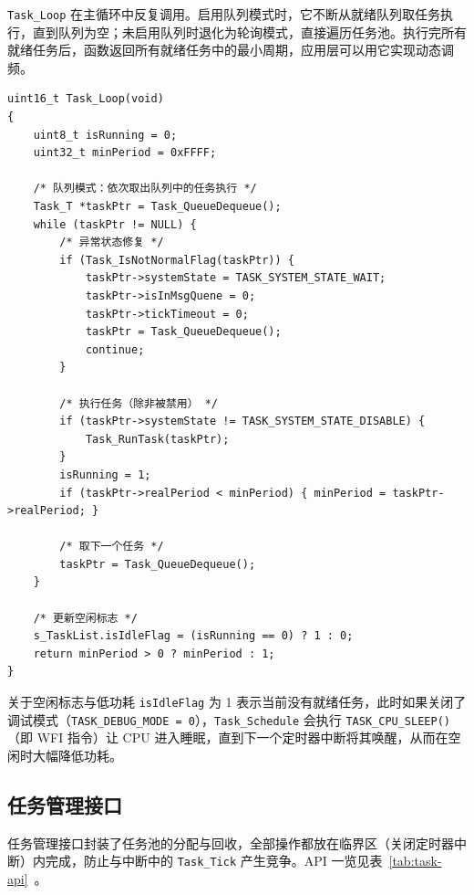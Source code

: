\texttt{Task\_Loop} 在主循环中反复调用。启用队列模式时，它不断从就绪队列取任务执行，直到队列为空；未启用队列时退化为轮询模式，直接遍历任务池。执行完所有就绪任务后，函数返回所有就绪任务中的最小周期，应用层可以用它实现动态调频。

\begin{lstlisting}[style=c]
uint16_t Task_Loop(void)
{
    uint8_t isRunning = 0;
    uint32_t minPeriod = 0xFFFF;

    /* 队列模式：依次取出队列中的任务执行 */
    Task_T *taskPtr = Task_QueueDequeue();
    while (taskPtr != NULL) {
        /* 异常状态修复 */
        if (Task_IsNotNormalFlag(taskPtr)) {
            taskPtr->systemState = TASK_SYSTEM_STATE_WAIT;
            taskPtr->isInMsgQuene = 0;
            taskPtr->tickTimeout = 0;
            taskPtr = Task_QueueDequeue();
            continue;
        }

        /* 执行任务（除非被禁用） */
        if (taskPtr->systemState != TASK_SYSTEM_STATE_DISABLE) {
            Task_RunTask(taskPtr);
        }
        isRunning = 1;
        if (taskPtr->realPeriod < minPeriod) { minPeriod = taskPtr->realPeriod; }

        /* 取下一个任务 */
        taskPtr = Task_QueueDequeue();
    }

    /* 更新空闲标志 */
    s_TaskList.isIdleFlag = (isRunning == 0) ? 1 : 0;
    return minPeriod > 0 ? minPeriod : 1;
}
\end{lstlisting}

\begin{anybox}{关于空闲标志与低功耗}
\texttt{isIdleFlag} 为 1 表示当前没有就绪任务，此时如果关闭了调试模式（\texttt{TASK\_DEBUG\_MODE = 0}），\texttt{Task\_Schedule} 会执行 \texttt{TASK\_CPU\_SLEEP()}（即 WFI 指令）让 CPU 进入睡眠，直到下一个定时器中断将其唤醒，从而在空闲时大幅降低功耗。

\end{anybox}
\subsection{任务管理接口}

任务管理接口封装了任务池的分配与回收，全部操作都放在临界区（关闭定时器中断）内完成，防止与中断中的 \texttt{Task\_Tick} 产生竞争。API 一览见表~\ref{tab:task-api}~。


